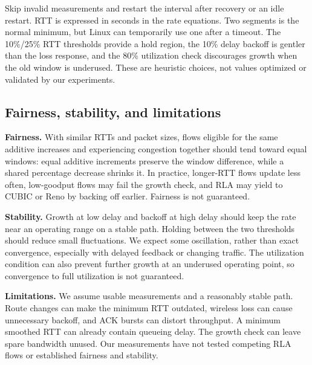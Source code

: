 \documentclass[11pt]{article}
\begin{document}
Skip invalid measurements and restart the interval after recovery or an idle
restart. RTT is expressed in seconds in the rate equations. Two segments is
the normal minimum, but Linux can temporarily use one after a timeout.
The 10\%/25\% RTT thresholds provide a hold region, the 10\% delay backoff
is gentler than the loss response, and the 80\% utilization check discourages
growth when the old window is underused. These are heuristic choices, not
values optimized or validated by our experiments.

\subsection*{Fairness, stability, and limitations}

\textbf{Fairness.} With similar RTTs and packet sizes, flows eligible for
the same additive increases and experiencing congestion together should tend
toward equal windows: equal additive increments preserve the window
difference, while a shared percentage decrease shrinks it. In practice,
longer-RTT flows update less often, low-goodput flows may fail the growth check,
and RLA may yield to CUBIC or Reno by backing off earlier. Fairness is not guaranteed.

\textbf{Stability.} Growth at low delay and backoff at high delay should keep
the rate near an operating range on a stable path. Holding between the two
thresholds should reduce small fluctuations. We expect some oscillation, rather
than exact convergence, especially with delayed feedback or changing traffic.
The utilization condition can also prevent further growth at an underused
operating point, so convergence to full utilization is not guaranteed.

\textbf{Limitations.} We assume usable measurements and a reasonably stable
path. Route changes can make the minimum RTT outdated, wireless loss can cause
unnecessary backoff, and ACK bursts can distort throughput. A minimum
smoothed RTT can already contain queueing delay. The growth check
can leave spare bandwidth unused. Our measurements have not tested competing
RLA flows or established fairness and stability.


\endgroup
\end{document}
